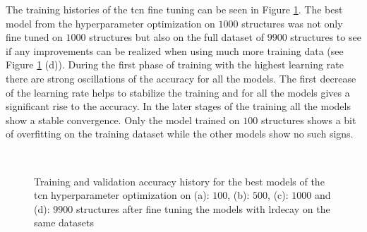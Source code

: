 \documentclass[conference]{IEEEtran}
\begin{document}
 The training histories of the \gls{tcn} fine tuning can be seen in Figure \ref{fig:accuracy_adaptiveLR_TCN}. The best model from the hyperparameter optimization on $ 1000 $ structures was not only fine tuned on $ 1000 $ structures but also on the full dataset of $ 9900 $ structures to see if any improvements can be realized when using much more training data (see Figure \ref{fig:accuracy_adaptiveLR_TCN} (d)). During the first phase of training with the highest learning rate there are strong oscillations of the accuracy for all the models. The first decrease of the learning rate helps to stabilize the training and for all the models gives a significant rise to the accuracy. In the later stages of the training all the models show a stable convergence. Only the model trained on $ 100 $ structures shows a bit of overfitting on the training dataset while the other models show no such signs. 

\begin{figure}[htp]
	\centering
	\quad
	\\
	\quad
	\caption{Training and validation accuracy history for the best models of the \gls{tcn} hyperparameter optimization on (a): $ 100 $, (b): $ 500 $, (c): $ 1000 $ and (d): $ 9900 $ structures after fine tuning the models with \gls{lrdecay} on the same datasets}
	\label{fig:accuracy_adaptiveLR_TCN}
\end{figure}
\end{document}
